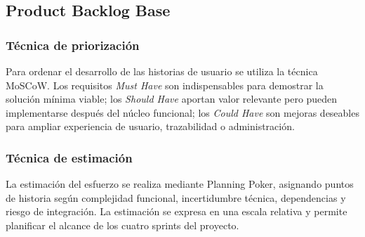 \documentclass[12pt,a4paper,oneside]{report}
\begin{document}
\subsection{Product Backlog Base}\label{subsec:product-backlog-base}

\subsubsection{Técnica de priorización}\label{subsubsec:tecnica-priorizacion}

Para ordenar el desarrollo de las historias de usuario se utiliza la técnica MoSCoW. Los requisitos \textit{Must Have} son indispensables para demostrar la solución mínima viable; los \textit{Should Have} aportan valor relevante pero pueden implementarse después del núcleo funcional; los \textit{Could Have} son mejoras deseables para ampliar experiencia de usuario, trazabilidad o administración.

\subsubsection{Técnica de estimación}\label{subsubsec:tecnica-estimacion}

La estimación del esfuerzo se realiza mediante Planning Poker, asignando puntos de historia según complejidad funcional, incertidumbre técnica, dependencias y riesgo de integración. La estimación se expresa en una escala relativa y permite planificar el alcance de los cuatro sprints del proyecto.
\end{document}
